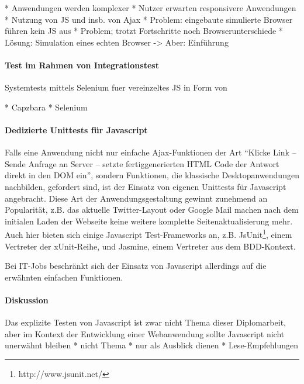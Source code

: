 * Anwendungen werden komplexer
* Nutzer erwarten responsivere Anwendungen 
* Nutzung von JS und insb. von Ajax
* Problem: eingebaute simulierte Browser führen kein JS aus
* Problem; trotzt Fortschritte noch Browserunterschiede
* Lösung: Simulation eines echten Browser -> Aber: Einführung

\paragraph{Test im Rahmen von Integrationstest}
Systemtests mittels Selenium fuer vereinzeltes JS in Form von

* Capzbara
* Selenium

\paragraph{Dedizierte Unittests für Javascript} Falls eine Anwendung nicht nur einfache Ajax-Funktionen der Art "`Klicke Link -- Sende Anfrage an Server -- setzte fertiggenerierten HTML Code der Antwort direkt in den DOM ein"', sondern Funktionen, die klassische Desktopanwendungen nachbilden, gefordert sind, ist der Einsatz von eigenen Unittests für Javascript angebracht.
Diese Art der Anwendungsgestaltung gewinnt zunehmend an Popularität, z.B. das aktuelle Twitter-Layout oder Google Mail machen nach dem initialen Laden der Webseite keine weitere komplette Seitenaktualisierung mehr. 
Auch hier bieten sich einige Javascript Test-Frameworks an, z.B. JsUnit\footnote{http://www.jsunit.net/}, einem Vertreter der xUnit-Reihe, und Jasmine, einem Vertreter aus dem BDD-Kontext. %

Bei IT-Jobs beschränkt sich der Einsatz von Javascript allerdings auf die erwähnten einfachen Funktionen.

\paragraph{Diskussion} Das explizite Testen von Javascript ist zwar nicht Thema dieser Diplomarbeit, aber im Kontext der Entwicklung einer Webanwendung sollte Javascript nicht unerwähnt bleiben
* nicht Thema
* nur als Ausblick dienen
* Lese-Empfehlungen 
